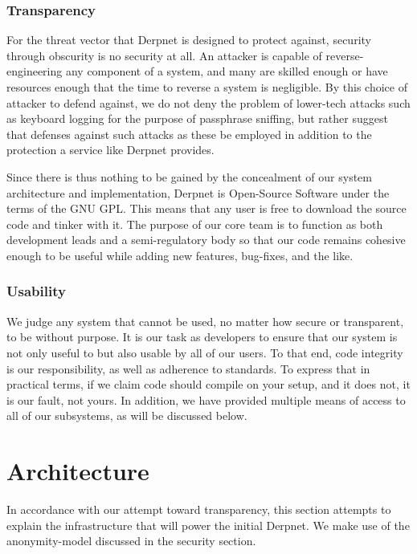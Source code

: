 \documentclass[11pt]{article}
\begin{document}
\subsubsection{Transparency}

For the threat vector that Derpnet is designed to protect against, security
through obscurity is no security at all.  An attacker is capable of
reverse-engineering any component of a system, and many are skilled enough or
have resources enough that the time to reverse a system is negligible.  By
this choice of attacker to defend against, we do not deny the problem of
lower-tech attacks such as keyboard logging for the purpose of passphrase
sniffing, but rather suggest that defenses against such attacks as these be
employed in addition to the protection a service like Derpnet provides.

Since there is thus nothing to be gained by the concealment of our system
architecture and implementation, Derpnet is Open-Source Software under the
terms of the GNU GPL.  This means that any user is free to download the source
code and tinker with it.  The purpose of our core team is to function as both
development leads and a semi-regulatory body so that our code remains cohesive
enough to be useful while adding new features, bug-fixes, and the like.

\subsubsection{Usability}

We judge any system that cannot be used, no matter how secure or transparent,
to be without purpose.  It is our task as developers to ensure that our system
is not only useful to but also usable by all of our users.  To that end, code
integrity is our responsibility, as well as adherence to standards.  To
express that in practical terms, if we claim code should compile on your
setup, and it does not, it is our fault, not yours.  In addition, we have
provided multiple means of access to all of our subsystems, as will be
discussed below.

\section{Architecture}

In accordance with our attempt toward transparency, this section attempts to
explain the infrastructure that will power the initial Derpnet.  We make use
of the anonymity-model discussed in the security section.
\end{document}
